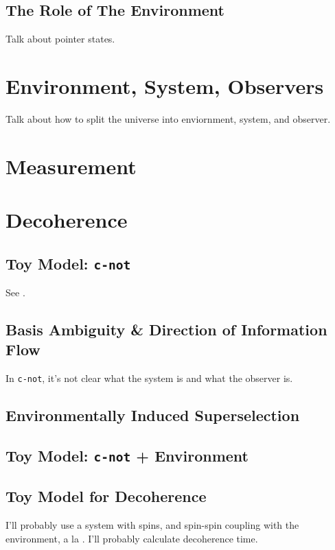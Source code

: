 \documentclass[aps,prd,final,twocolumn,10pt,longbibliography,nobibnotes]{revtex4-1}
\begin{document}
  \subsection{The Role of The Environment}
    Talk about pointer states.
    
\allowbreak
\section{Environment, System, Observers}
  Talk about how to split the universe into enviornment, system, and observer.

\section{Measurement}

\section{Decoherence}
\allowbreak
  \subsection{Toy Model: \texorpdfstring{\texttt{c-not}}{c-not}}
    See \cite{zurek2003decoherence}.
   
  \allowbreak
  \subsection{Basis Ambiguity \& Direction of Information Flow}
    In \texttt{c-not}, it's not clear what the system is and what the observer is.
    
  \subsection{Environmentally Induced Superselection}
  
  
  \subsection{Toy Model: \texorpdfstring{\texttt{c-not}}{c-not} + Environment}
  
  \allowbreak
  \subsection{Toy Model for Decoherence}
    I'll probably use a system with spins, and spin-spin coupling with the environment, a la \cite{Cucchietti2005}.  I'll probably calculate decoherence time.
\end{document}
